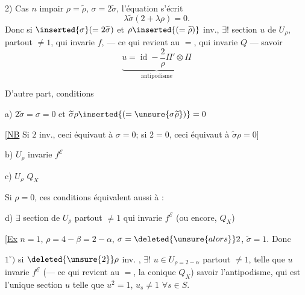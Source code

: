 
2) Cas $n$ impair $\rho=\widetilde\rho$, $\sigma=2\widetilde\sigma$,
l'équation s'écrit
\[
\lambda\widetilde\sigma(2+\lambda\rho)=0.
\]
Donc si $\inserted{\sigma}(=2\widetilde\sigma)$ et $\rho\inserted{(=\widetilde\rho)}$ inv.,
 $\exists!$ section $u$ de $U_\rho$, partout $\ne1$,
 qui invarie $f$, --- ce qui revient au $=$, qui invarie $Q$ --- savoir
\[
\underbrace{u=\operatorname{id}-\frac{2}{\rho}\Pi'\otimes\Pi}_{\text{antipodisme}}
\]

D'autre part, conditions 
\deleted{$\unsure{\sigma}$}

a) $2\widetilde\sigma=\sigma=0$ et
$\widetilde\sigma\rho\inserted{(=\unsure{\sigma\widetilde\rho})}=0$

[\uline{NB} Si $2$ inv., ceci équivaut à $\sigma=0$; si $2=0$,
ceci équivaut à $\widetilde\sigma\rho=0$]

b) $U_\rho$ invarie $f^{\mathcal E}$

c) $U_\rho$ \unsure{---} $Q_X$

Si  $\rho=0$, ces conditions équivalent aussi à :

d) $\exists$  section de $U_\rho$ partout $\ne1$ qui
invarie $f^{\mathcal E}$ (ou encore, $Q_X$)

[\uline{Ex} $n=1$, $\rho=4-\beta=2-\alpha$, $\sigma=\deleted{\unsure{alors}}2$,
$\widetilde\sigma=1$. Donc

 $1^\circ)$ si $\deleted{\unsure{2}}\rho$ inv.
,
 $\exists!$ $u\in U_{\rho=2-\alpha}$ partout $\ne1$,
telle que $u$ invarie $f^{\mathcal E}$ (--- ce qui revient au $=$,
 la conique $Q_X$)
savoir l'antipodisme, qui est l'unique section $u$ telle que
$u^2=1$, $u_s\ne1$ $\forall s\in S$.


